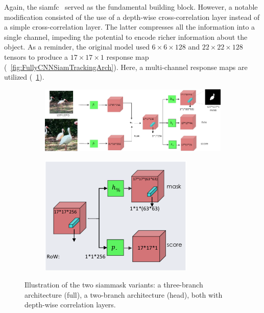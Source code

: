 Again, the \gls{siamfc}~\cite{bertinetto2016siamfc} served as the fundamental building block. However, a notable modification consisted of the use of a depth-wise cross-correlation layer instead of a simple cross-correlation layer. The latter compresses all the information into a single channel, impeding the potential to encode richer information about the object. As a reminder, the original model used $6 \times 6 \times 128$ and $22 \times 22 \times 128$ tensors to produce a $17 \times 17 \times 1$ response map (\figtext{}~\ref{fig:FullyCNNSiamTrackingArch}). Here, a multi-channel response maps are utilized (\figtext{}~\ref{fig:SiamMaskArchitecture}).

\begin{figure}[!t]
    \centering
    \begin{subfigure}[b]{0.68\textwidth}
        \centering
        \includegraphics[width=\textwidth]{figures/theoretical_foundations/siam_mask_architecture_3_branch.pdf}
        \caption[]{}
    \end{subfigure}
    \hfill
    \begin{subfigure}[b]{0.31\textwidth}
        \centering
        \includegraphics[width=\textwidth]{figures/theoretical_foundations/siam_mask_architecture_2_branch_head.pdf}
        \caption[]{}
    \end{subfigure}
    \caption[\gls{siammask} architecture]{Illustration of the two \gls{siammask} variants:  a three-branch architecture (full),  a two-branch architecture (head), both with depth-wise correlation layers. }
    \label{fig:SiamMaskArchitecture}
\end{figure}


